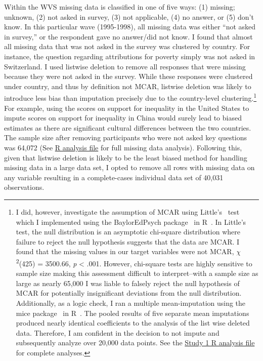 \documentclass{sfuthesis}
\begin{document}
Within the WVS missing data is classified in one of five ways: (1) missing; unknown, (2) not asked in survey, (3) not applicable, (4) no answer, or (5) don’t know. In this particular wave (1995-1998), all missing data was either “not asked in survey,” or the respondent gave no answer/did not know. I found that almost all missing data that was not asked in the survey was clustered by country. For instance, the question regarding attributions for poverty simply was not asked in Switzerland. I used listwise deletion to remove all responses that were missing because they were not asked in the survey. While these responses were clustered under country, and thus by definition not MCAR, listwise deletion was likely to introduce less bias than imputation precisely due to the country-level clustering.\footnote{I did, however, investigate the assumption of MCAR using Little’s~\cite{little81} test which I implemented using the BaylorEdPsych package~\cite{baylor} in R~\cite{rcore}. In Little’s~\cite{little81} test, the null distribution is an asymptotic chi-square distribution where failure to reject the null hypothesis suggests that the data are MCAR. I found that the missing values in our target variables were not MCAR, $\chi$\textsuperscript{2}(425) = 3500.66, \textit{p} < .001. However, chi-square tests are highly sensitive to sample size making this assessment difficult to interpret--with a sample size as large as nearly 65,000 I was liable to falsely reject the null hypothesis of MCAR for potentially insignificant deviations from the null distribution. Additionally, as a logic check, I ran a multiple mean-imputation using the mice package~\cite{vanbuuren11} in R~\cite{rcore}. The pooled results of five separate mean imputations produced nearly identical coefficients to the analysis of the list wise deleted data. Therefore, I am confident in the decision to not impute and subsequently analyze over 20,000 data points. See the \href{https://github.com/dwiwad/Dissertation/blob/master/Study\%201}{Study 1 R analysis file} for complete analyses.} For example, using the scores on support for inequality in the United States to impute scores on support for inequality in China would surely lead to biased estimates as there are significant cultural differences between the two countries. The sample size after removing participants who were not asked key questions was 64,072 (See \href{http://github.com/dwiwad/Dissertation/blob/master/Study 1/Study_1.pdf}{R analysis file} for full missing data analysis). Following this, given that listwise deletion is likely to be the least biased method for handling missing data in a large data set, I opted to remove all rows with missing data on any variable resulting in a complete-cases individual data set of 40,031 observations. 
\end{document}
